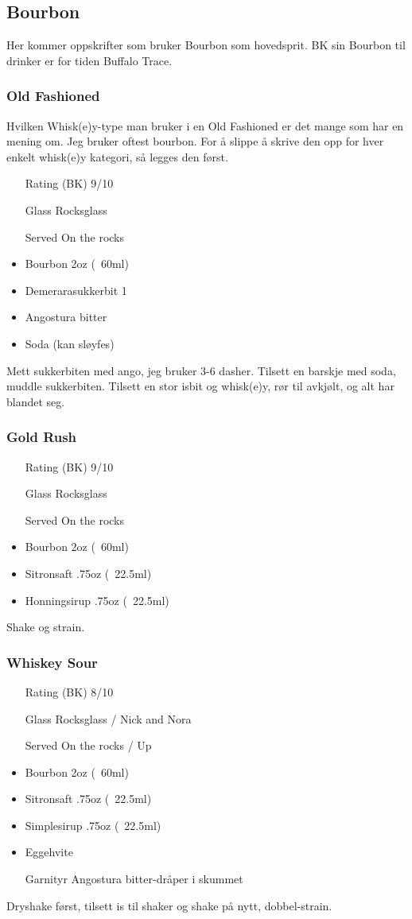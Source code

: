 
\subsection{Bourbon}
Her kommer oppskrifter som bruker Bourbon som hovedsprit. BK sin Bourbon til drinker er for tiden Buffalo Trace.

\subsubsection{Old Fashioned}
Hvilken Whisk(e)y-type man bruker i en Old Fashioned er det mange som har en mening om. Jeg bruker oftest bourbon. For å slippe å skrive den opp for hver enkelt whisk(e)y kategori, så legges den først.
\begin{itemize}
    \item[Rating (BK)] 9/10
    \item[Glass] Rocksglass
    \item[Served] On the rocks
    \item Bourbon 2oz (~60ml)
    \item Demerarasukkerbit 1
    \item Angostura bitter
    \item Soda (kan sløyfes)
\end{itemize}
Mett sukkerbiten med ango, jeg bruker 3-6 dasher. Tilsett en barskje med soda, muddle sukkerbiten. Tilsett en stor isbit og whisk(e)y, rør til avkjølt, og alt har blandet seg. 

\subsubsection{Gold Rush}
\begin{itemize}
    \item[Rating (BK)] 9/10
    \item[Glass] Rocksglass
    \item[Served] On the rocks
    \item Bourbon 2oz (~60ml)
    \item Sitronsaft .75oz (~22.5ml)
    \item Honningsirup .75oz (~22.5ml)
\end{itemize}
Shake og strain.

\subsubsection{Whiskey Sour}
\label{drink:w_sour}
\begin{itemize}
    \item[Rating (BK)] 8/10 
    \item[Glass] Rocksglass / Nick and Nora
    \item[Served] On the rocks / Up
    \item Bourbon 2oz (~60ml)
    \item Sitronsaft .75oz (~22.5ml)
    \item Simplesirup .75oz (~22.5ml)
    \item Eggehvite
    \item[Garnityr] Angostura bitter-dråper i skummet
\end{itemize}
Dryshake først, tilsett is til shaker og shake på nytt, dobbel-strain.

